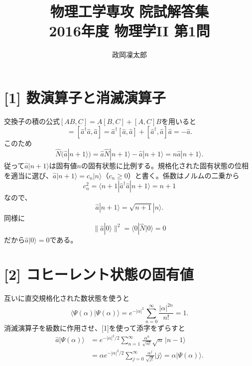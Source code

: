 \documentclass[11pt,a4paper]{article}
\title{物理工学専攻 院試解答集\\2016年度 物理学II 第1問}
\author{政岡凜太郎}
\date{}
\begin{document}
\maketitle

\section*{[1] 数演算子と消滅演算子}
交換子の積の公式$[AB,C]=A[B,C]+[A,C]B$を用いると
\begin{equation}
  [\hat N,\hat a]=[\hat a^\dagger\hat a,\hat a]
  =\hat a^\dagger[\hat a,\hat a]+[\hat a^\dagger,\hat a]\hat a
  =-\hat a.
\end{equation}
このため
\begin{equation}
  \hat N(\hat a|n+1\rangle)
  =\hat a\hat N|n+1\rangle-\hat a|n+1\rangle
  =n\hat a|n+1\rangle.
\end{equation}
従って$\hat a|n+1\rangle$は固有値$n$の固有状態に比例する。規格化された固有状態の位相を適当に選び、$\hat a|n+1\rangle=c_n|n\rangle$（$c_n\ge0$）と書く。係数はノルムの二乗から
\begin{equation}
  c_n^2=\langle n+1|\hat a^\dagger\hat a|n+1\rangle=n+1
\end{equation}
なので、
\begin{equation}
  \boxed{\hat a|n+1\rangle=\sqrt{n+1}|n\rangle.}
\end{equation}
同様に
\begin{equation}
  \|\hat a|0\rangle\|^2=\langle0|\hat N|0\rangle=0
\end{equation}
だから$\boxed{\hat a|0\rangle=0}$である。

\section*{[2] コヒーレント状態の固有値}
互いに直交規格化された数状態を使うと
\begin{equation}
  \langle\Psi(\alpha)|\Psi(\alpha)\rangle
  =e^{-|\alpha|^2}\sum_{n=0}^{\infty}\frac{|\alpha|^{2n}}{n!}=1.
\end{equation}
消滅演算子を級数に作用させ、[1]を使って添字をずらすと
\begin{align}
  \hat a|\Psi(\alpha)\rangle
  &=e^{-|\alpha|^2/2}\sum_{n=1}^{\infty}
    \frac{\alpha^n}{\sqrt{n!}}\sqrt n\,|n-1\rangle\\
  &=\alpha e^{-|\alpha|^2/2}\sum_{j=0}^{\infty}
    \frac{\alpha^j}{\sqrt{j!}}|j\rangle
   =\boxed{\alpha|\Psi(\alpha)\rangle}.
\end{align}
\end{document}
